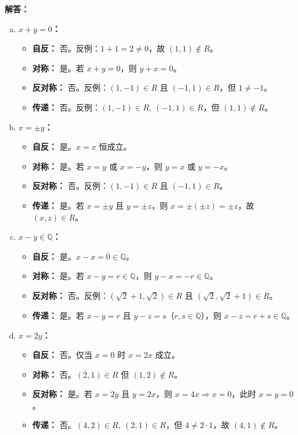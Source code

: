 \documentclass[11pt,UTF8]{article}
\begin{document}
\textbf{解答：}

\begin{enumerate}[a)]
    \item \textbf{$x+y=0$：}
    \begin{itemize}
        \item \textbf{自反：} 否。反例：$1+1=2 \neq 0$，故 $(1,1) \notin R$。
        \item \textbf{对称：} 是。若 $x+y=0$，则 $y+x=0$。
        \item \textbf{反对称：} 否。反例：$(1,-1) \in R$ 且 $(-1,1) \in R$，但 $1 \neq -1$。
        \item \textbf{传递：} 否。反例：$(1,-1) \in R,\ (-1,1) \in R$，但 $(1,1) \notin R$。
    \end{itemize}

    \item \textbf{$x = \pm y$：}
    \begin{itemize}
        \item \textbf{自反：} 是。$x = x$ 恒成立。
        \item \textbf{对称：} 是。若 $x = y$ 或 $x = -y$，则 $y = x$ 或 $y = -x$。
        \item \textbf{反对称：} 否。反例：$(1,-1) \in R$ 且 $(-1,1) \in R$。
        \item \textbf{传递：} 是。若 $x = \pm y$ 且 $y = \pm z$，则 $x = \pm(\pm z) = \pm z$，故 $(x,z) \in R$。
    \end{itemize}

    \item \textbf{$x-y \in \mathbb{Q}$：}
    \begin{itemize}
        \item \textbf{自反：} 是。$x-x = 0 \in \mathbb{Q}$。
        \item \textbf{对称：} 是。若 $x-y = r \in \mathbb{Q}$，则 $y-x = -r \in \mathbb{Q}$。
        \item \textbf{反对称：} 否。反例：$(\sqrt{2}+1, \sqrt{2}) \in R$ 且 $(\sqrt{2}, \sqrt{2}+1) \in R$。
        \item \textbf{传递：} 是。若 $x-y = r$ 且 $y-z = s$（$r,s \in \mathbb{Q}$），则 $x-z = r+s \in \mathbb{Q}$。
    \end{itemize}

    \item \textbf{$x = 2y$：}
    \begin{itemize}
        \item \textbf{自反：} 否。仅当 $x=0$ 时 $x=2x$ 成立。
        \item \textbf{对称：} 否。$(2,1) \in R$ 但 $(1,2) \notin R$。
        \item \textbf{反对称：} 是。若 $x=2y$ 且 $y=2x$，则 $x=4x \Rightarrow x=0$，此时 $x=y=0$。
        \item \textbf{传递：} 否。$(4,2) \in R,\ (2,1) \in R$，但 $4 \neq 2 \cdot 1$，故 $(4,1) \notin R$。
    \end{itemize}


\end{enumerate}
\end{document}
